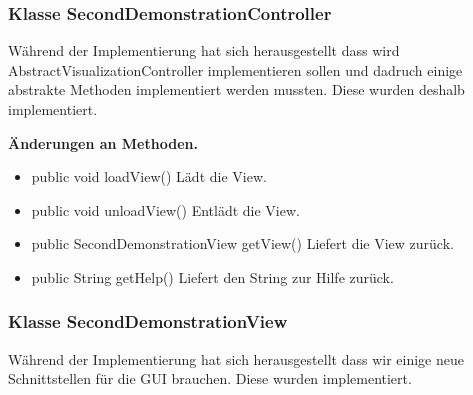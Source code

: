 \documentclass{article}
\begin{document}
    \subsubsection{Klasse SecondDemonstrationController}
	Während der Implementierung hat sich herausgestellt dass wird AbstractVisualizationController implementieren sollen und dadruch 
	einige abstrakte Methoden implementiert werden mussten. Diese wurden deshalb implementiert.\newline
           
    \textbf{Änderungen an Methoden.}
      \begin{itemize}
		\item public void loadView()\newline
              Lädt die View.
        \item public void unloadView()\newline
              Entlädt die View.
        \item public SecondDemonstrationView getView()\newline
              Liefert die View zurück.
        \item public String getHelp()\newline
              Liefert den String zur Hilfe zurück.
      \end{itemize}

    \subsubsection{Klasse SecondDemonstrationView}
	Während der Implementierung hat sich herausgestellt dass wir einige neue Schnittstellen für die GUI brauchen. Diese wurden implementiert.\newline
           
\end{document}
